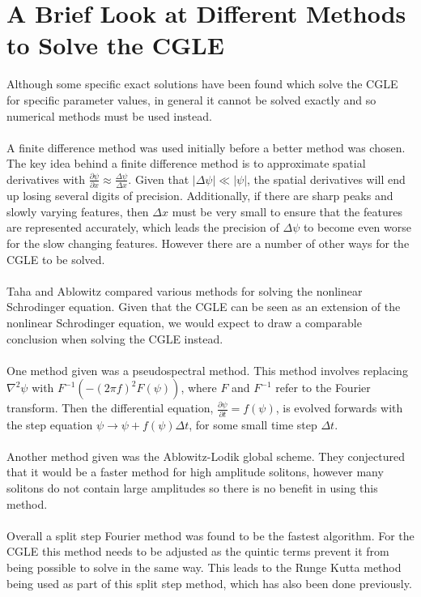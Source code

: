 \documentclass[a4paper,12pt]{report}
\begin{document}
\section{A Brief Look at Different Methods to Solve the CGLE}
Although some specific exact solutions have been found which solve the CGLE for specific parameter values\cite{exact}, in general it cannot be solved exactly and so numerical methods must be used instead. 
\\
\\
A finite difference method was used initially before a better method was chosen. The key idea behind a finite difference method is to approximate spatial derivatives with $\frac{\partial \psi}{ \partial x}\approx \frac{\Delta \psi}{\Delta x}$. Given that $|\Delta \psi|\ll |\psi|$, the spatial derivatives will end up losing several digits of precision. Additionally, if there are sharp peaks and slowly varying features, then $\Delta x$ must be very small to ensure that the features are represented accurately, which leads the precision of $\Delta \psi$ to become even worse for the slow changing features. However there are a number of other ways for the CGLE to be solved. 
\\
\\
Taha and Ablowitz \cite{taha} compared various methods for solving the nonlinear Schrodinger equation. Given that the CGLE can be seen as an extension of the nonlinear Schrodinger equation, we would expect to draw a comparable conclusion when solving the CGLE instead. 
\\
\\
One method given was a pseudospectral method. This method involves replacing $\nabla^2\psi$ with $F^{-1}(-(2\pi f)^2F(\psi))$, where $F$ and $F^{-1}$ refer to the Fourier transform. Then the differential equation, $\frac{\partial \psi}{\partial t}=f(\psi)$, is evolved forwards with the step equation $\psi\rightarrow\psi+f(\psi)\Delta t$, for some small time step $\Delta t$.
\\\\
Another method given was the Ablowitz-Lodik global scheme. They conjectured that it would be a faster method for high amplitude solitons, however many solitons do not contain large amplitudes so there is no benefit in using this method. 
\\
\\
Overall a split step Fourier method was found to be the fastest algorithm. For the CGLE this method needs to be adjusted as the quintic terms prevent it from being possible to solve in the same way. This leads to the Runge Kutta method being used as part of this split step method, which has also been done previously. \cite{2001,spiny,spike,extreme,bch}
\end{document}
